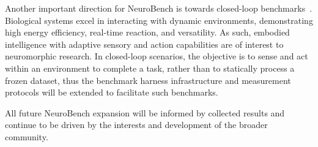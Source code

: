 Another important direction for NeuroBench is towards closed-loop benchmarks~\cite{closedloop-andre, closedloop-terry}. Biological systems excel in interacting with dynamic environments, demonstrating high energy efficiency, real-time reaction, and versatility. As such, embodied intelligence with adaptive sensory and action capabilities are of interest to neuromorphic research. In closed-loop scenarios, the objective is to sense and act within an environment to complete a task, rather than to statically process a frozen dataset, thus the benchmark harness infrastructure and measurement protocols will be extended to facilitate such benchmarks.



All future NeuroBench expansion will be informed by collected results and continue to be driven by the interests and development of the broader community.




